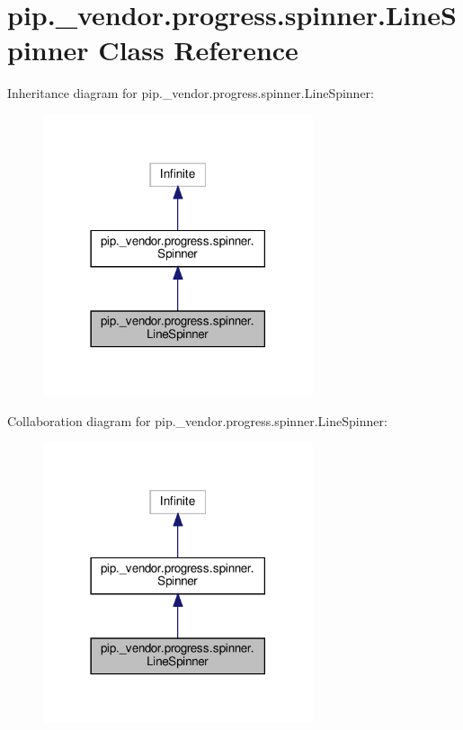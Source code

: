 \hypertarget{classpip_1_1__vendor_1_1progress_1_1spinner_1_1LineSpinner}{}\section{pip.\+\_\+vendor.\+progress.\+spinner.\+Line\+Spinner Class Reference}
\label{classpip_1_1__vendor_1_1progress_1_1spinner_1_1LineSpinner}


Inheritance diagram for pip.\+\_\+vendor.\+progress.\+spinner.\+Line\+Spinner\+:
\nopagebreak
\begin{figure}[H]
\begin{center}
\leavevmode
\includegraphics[width=225pt]{classpip_1_1__vendor_1_1progress_1_1spinner_1_1LineSpinner__inherit__graph}
\end{center}
\end{figure}


Collaboration diagram for pip.\+\_\+vendor.\+progress.\+spinner.\+Line\+Spinner\+:
\nopagebreak
\begin{figure}[H]
\begin{center}
\leavevmode
\includegraphics[width=225pt]{classpip_1_1__vendor_1_1progress_1_1spinner_1_1LineSpinner__coll__graph}
\end{center}
\end{figure}

